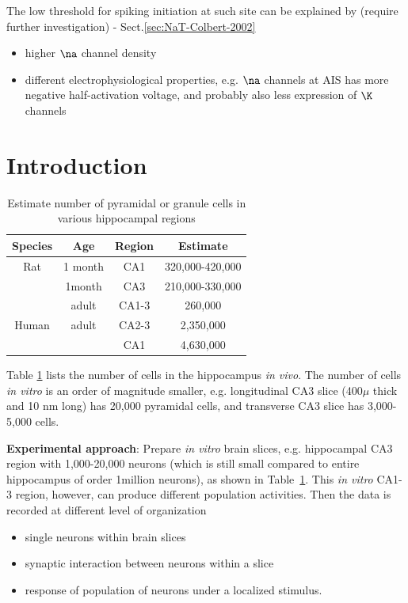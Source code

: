 The low threshold for spiking initiation at such site can be explained by
(require further investigation) - Sect.\ref{sec:NaT-Colbert-2002}
\begin{itemize}
  \item higher $\na$ channel density
  
  \item different electrophysiological properties, e.g. $\na$ channels at AIS
  has more negative half-activation voltage, and probably also less expression
  of $\K$ channels
\end{itemize}



 
\section{Introduction}
\label{sec:introduction-4}

\begin{table}[!hbt]
  \begin{center}
    \caption{Estimate number of pyramidal or granule cells in various
      hippocampal regions}
    \begin{tabular}{cccc} 
      \hline
      Species & Age & Region & Estimate \\ 
      \hline\hline
      Rat & 1 month & CA1 & 320,000-420,000 \\
      & 1month & CA3 & 210,000-330,000 \\
      & adult & CA1-3 & 260,000 \\
      Human & adult & CA2-3 & 2,350,000 \\
      & & CA1 & 4,630,000 \\
    \end{tabular}
  \end{center}
  \label{tab:pyramidal_cell_estimate}
\end{table}
Table \ref{tab:pyramidal_cell_estimate} lists the number of cells in
the hippocampus {\it in vivo}. The number of cells {\it in vitro} is
an order of magnitude smaller, e.g. longitudinal CA3 slice (400$\mu$
thick and 10 nm long) has 20,000 pyramidal cells, and transverse CA3
slice has 3,000-5,000 cells. 

{\bf Experimental approach}: Prepare {\it in vitro} brain slices,
e.g. hippocampal CA3 region with 1,000-20,000 neurons (which is still
small compared to entire hippocampus of order 1million neurons), as
shown in Table~\ref{tab:pyramidal_cell_estimate}. This {\it in vitro}
CA1-3 region, however, can produce different population activities.
Then the data is recorded at different level of organization
\begin{itemize}
\item single neurons within brain slices
\item synaptic interaction between neurons within a slice
\item response of population of neurons under a localized stimulus. 
\end{itemize}

